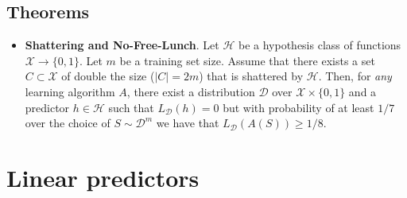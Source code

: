\documentclass[../template.tex]{subfiles}
\begin{document}
\subsection{Theorems}
\begin{itemize}
    \item \textbf{Shattering and No-Free-Lunch}. Let $\mathcal{H}$ be a hypothesis class of functions $\mathcal{X} \to\{0,1\}$. Let $m$ be a training set size. Assume that there exists a set $C \subset \mathcal{X}$ of double the size ($|C| = 2m$) that is shattered by $\mathcal{H}$. Then, for \textit{any} learning algorithm $A$, there exist a distribution $\mathcal{D}$ over $\mathcal{X}\times \{0,1\}$ and a predictor $h \in \mathcal{H}$ such that $L_{\mathcal{D}}(h) = 0$ but with probability of at least $1/7$ over the choice of $S \sim \mathcal{D}^m$ we have that $L_{\mathcal{D}}(A(S)) \geq 1/8$.   
\end{itemize}


\section{Linear predictors}
\end{document}
